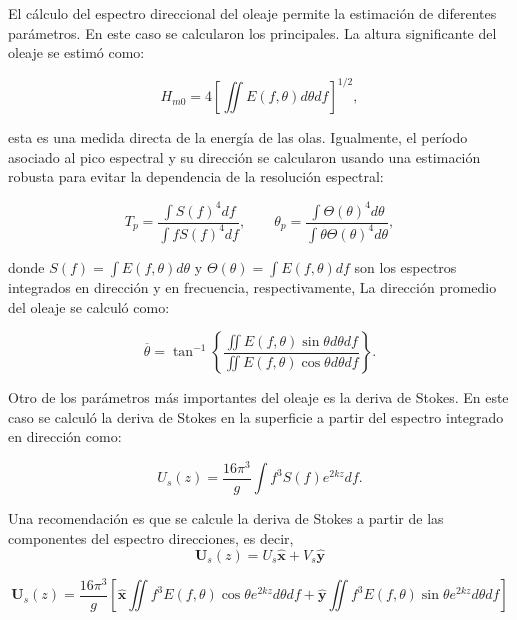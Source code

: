 \documentclass[11pt]{article}
\begin{document}
El cálculo del espectro direccional del oleaje permite la estimación de
diferentes parámetros. En este caso se calcularon los principales. La altura
significante del oleaje se estimó como:

\begin{equation}
  H_{m0} = 4 \left[ \iint E(f, \theta) d\theta df \right]^{1/2},
\end{equation}

esta es una medida directa de la energía de las olas. Igualmente, el período
asociado al pico espectral y su dirección se calcularon usando una estimación
robusta para evitar la dependencia de la resolución espectral:

\begin{equation}
  T_{p} = \frac{{\displaystyle \int} S(f)^4 df}{{\displaystyle \int} f S(f)^4 df},
  \hspace{2em}
  \theta_{p} = \frac{{\displaystyle \int} \Theta(\theta)^4 d\theta}{{\displaystyle \int}
  \theta \Theta(\theta)^4 d\theta},
\end{equation}

donde $S(f)=\int{E(f, \theta)} d\theta$ y $\Theta(\theta) = \int{E(f,\theta)}
df$ son los espectros integrados en dirección y en frecuencia, respectivamente,
La dirección promedio del oleaje se calculó como:

\begin{equation}
  \overline{\theta} = \tan^{-1} \left\{ \frac{
                 {\displaystyle \iint E(f,\theta)\sin\theta} d\theta df}
                {{\displaystyle \iint E(f,\theta)\cos\theta } d\theta df}
                         \right\}.
\end{equation}

Otro de los parámetros más importantes del oleaje es la deriva de Stokes. En
este caso se calculó la deriva de Stokes en la superficie a partir del espectro
integrado en dirección como:

\begin{equation}
  U_{s}(z) = \frac{16 \pi^3}{g} \int f^3 S(f) e^{2kz} df.
\end{equation}

Una recomendación es que se calcule la deriva de Stokes a partir de las
componentes del espectro direcciones, es decir,
\begin{equation}
  \mathbf{U}_{s}(z) = U_s \mathbf{\hat{x}} + V_s \mathbf{\hat{y}}
\end{equation}

\begin{equation}
  \mathbf{U}_{s}(z) = \frac{16 \pi^3}{g} \left[
    \mathbf{\hat{x}} {\displaystyle \iint f^3 E(f,\theta)\cos\theta } e^{2kz} d\theta df + 
    \mathbf{\hat{y}} {\displaystyle \iint f^3 E(f,\theta)\sin\theta } e^{2kz} d\theta df
  \right]
\end{equation}
\end{document}
